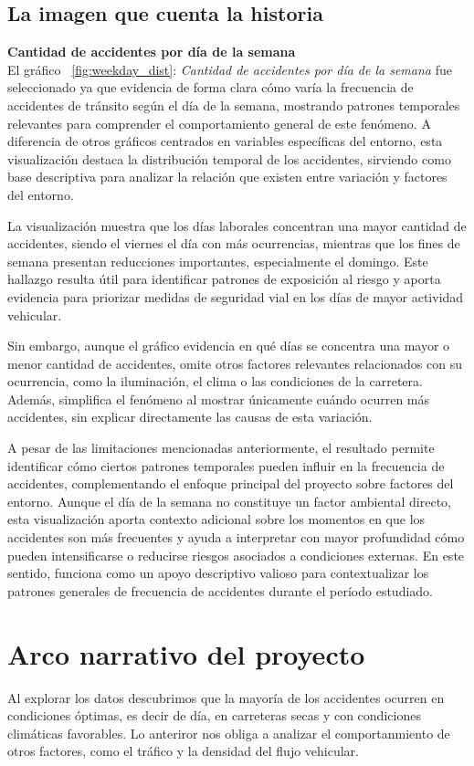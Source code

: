 \documentclass[12pt]{article}
\begin{document}
\subsection{La imagen que cuenta la historia}
\textbf{Cantidad de accidentes por día de la semana}\\
El gráfico ~\ref{fig:weekday_dist}: \textit{Cantidad de accidentes por día de la semana} fue seleccionado ya que evidencia 
de forma clara cómo varía la frecuencia de accidentes de tránsito según el día de la semana, mostrando 
patrones temporales relevantes para comprender el comportamiento general de este fenómeno. A diferencia de otros gráficos 
centrados en variables específicas del entorno, esta visualización destaca la distribución temporal de los accidentes,
sirviendo como base descriptiva para analizar la relación que existen entre variación y factores del entorno.

La visualización muestra que los días laborales concentran una mayor cantidad de accidentes, siendo el viernes el día con 
más ocurrencias, mientras que los fines de semana presentan reducciones importantes, especialmente el domingo. Este 
hallazgo resulta útil para identificar patrones de exposición al riesgo y aporta evidencia para
priorizar medidas de seguridad vial en los días de mayor actividad vehicular.

Sin embargo, aunque el gráfico evidencia en qué días se concentra una mayor o menor cantidad de accidentes, 
omite otros factores relevantes relacionados con su ocurrencia, como la iluminación, el clima o las condiciones de la 
carretera. Además, simplifica el fenómeno al mostrar únicamente cuándo ocurren más accidentes, sin explicar directamente 
las causas de esta variación.

A pesar de las limitaciones mencionadas anteriormente, el resultado permite identificar cómo ciertos patrones temporales pueden influir en la frecuencia de accidentes, 
complementando el enfoque principal del proyecto sobre factores del entorno. 
Aunque el día de la semana no constituye un factor ambiental directo, esta visualización aporta contexto adicional sobre 
los momentos en que los accidentes son más frecuentes y ayuda a interpretar con mayor profundidad cómo pueden intensificarse o 
reducirse riesgos asociados a condiciones externas. En este sentido, funciona como un apoyo descriptivo valioso 
para contextualizar los patrones generales de frecuencia de accidentes durante el período estudiado.




\section{Arco narrativo del proyecto}
Al explorar los datos descubrimos que la mayoría de los accidentes ocurren en
condiciones óptimas, es decir de día, en carreteras secas y con condiciones 
climáticas favorables. Lo anteriror nos obliga a analizar el comportanmiento de 
otros factores, como el tráfico y la densidad del flujo vehicular. 
\end{document}
